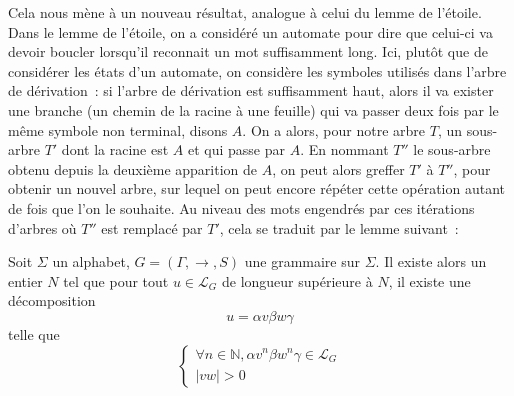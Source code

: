 Cela nous mène à un nouveau résultat, analogue à celui du lemme de l'étoile.
Dans le lemme de l'étoile, on a considéré un automate pour dire que celui-ci va
devoir boucler lorsqu'il reconnait un mot suffisamment long. Ici, plutôt que de
considérer les états d'un automate, on considère les symboles utilisés dans
l'arbre de dérivation~: si l'arbre de dérivation est suffisamment haut, alors
il va exister une branche (un chemin de la racine à une feuille) qui va passer
deux fois par le même symbole non terminal, disons $A$. On a alors, pour notre
arbre $T$, un sous-arbre $T'$ dont la racine est $A$ et qui passe par $A$. En
nommant $T''$ le sous-arbre obtenu depuis la deuxième apparition de $A$, on peut
alors greffer $T'$ à $T''$, pour obtenir un nouvel arbre, sur lequel on peut
encore répéter cette opération autant de fois que l'on le souhaite. Au niveau
des mots engendrés par ces itérations d'arbres où $T''$ est remplacé par $T'$,
cela se traduit par le lemme suivant~:

\begin{lemma}[Itération]
  Soit $\Sigma$ un alphabet, $G = (\Gamma,\to,S)$ une grammaire sur $\Sigma$.
  Il existe alors un entier $N$ tel que pour tout $u \in \mathcal L_G$ de
  longueur supérieure à $N$, il existe une décomposition
  \[u = \alpha v \beta w \gamma\]
  telle que
  \[\begin{cases}
  \forall n \in \mathbb N, \alpha v^n \beta w^n \gamma \in \mathcal L_G\\
  |vw| > 0
  \end{cases}\]
\end{lemma}


